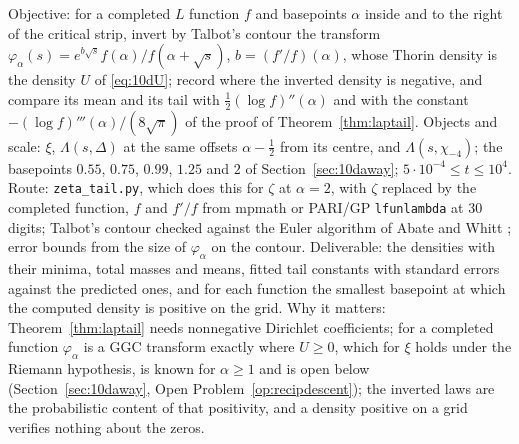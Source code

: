 \begin{compproblem}\label{cp:laptalbot}
Objective: for a completed $L$ function $f$ and basepoints $\alpha$ inside and to the right of the critical strip, invert by Talbot's contour the transform $\varphi_\alpha(s)=e^{b\sqrt s}f(\alpha)/f(\alpha+\sqrt s)$, $b=(f'/f)(\alpha)$, whose Thorin density is the density $U$ of \eqref{eq:10dU}; record where the inverted density is negative, and compare its mean and its tail with $\frac12(\log f)''(\alpha)$ and with the constant $-(\log f)'''(\alpha)/(8\sqrt\pi)$ of the proof of Theorem~\ref{thm:laptail}. Objects and scale: $\xi$, $\Lambda(s,\Delta)$ at the same offsets $\alpha-\frac12$ from its centre, and $\Lambda(s,\chi_{-4})$; the basepoints $0.55$, $0.75$, $0.99$, $1.25$ and $2$ of Section~\ref{sec:10daway}; $5\cdot10^{-4}\le t\le10^4$. Route: \texttt{zeta\_tail.py}, which does this for $\zeta$ at $\alpha=2$, with $\zeta$ replaced by the completed function, $f$ and $f'/f$ from mpmath or PARI/GP \texttt{lfunlambda} at $30$ digits; Talbot's contour checked against the Euler algorithm of Abate and Whitt \cite{abatewhitt2006}; error bounds from the size of $\varphi_\alpha$ on the contour. Deliverable: the densities with their minima, total masses and means, fitted tail constants with standard errors against the predicted ones, and for each function the smallest basepoint at which the computed density is positive on the grid. Why it matters: Theorem~\ref{thm:laptail} needs nonnegative Dirichlet coefficients; for a completed function $\varphi_\alpha$ is a GGC transform exactly where $U\ge0$, which for $\xi$ holds under the Riemann hypothesis, is known for $\alpha\ge1$ and is open below (Section~\ref{sec:10daway}, Open Problem~\ref{op:recipdescent}); the inverted laws are the probabilistic content of that positivity, and a density positive on a grid verifies nothing about the zeros.
\end{compproblem}
